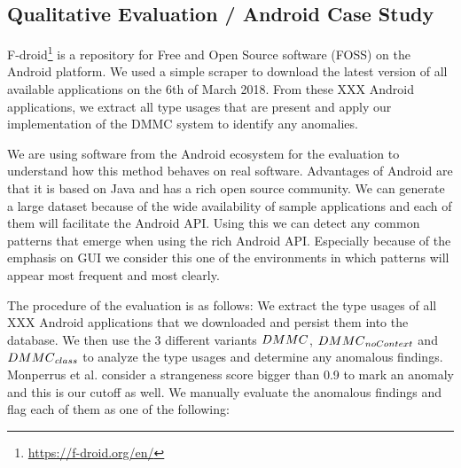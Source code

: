 \subsection{Qualitative Evaluation / Android Case Study}

F-droid\footnote{\url{https://f-droid.org/en/}} is a repository for Free and Open Source software (FOSS) on the Android platform.
We used a simple scraper to download the latest version of all available applications on the 6th of March 2018.
From these XXX Android applications, we extract all type usages that are present and apply our implementation of the DMMC system to identify any anomalies.

We are using software from the Android ecosystem for the evaluation to understand how this method behaves on real software.
Advantages of Android are that it is based on Java and has a rich open source community.
We can generate a large dataset because of the wide availability of sample applications and each of them will facilitate the Android API.
Using this we can detect any common patterns that emerge when using the rich Android API.
Especially because of the emphasis on GUI we consider this one of the environments in which patterns will appear most frequent and most clearly.

The procedure of the evaluation is as follows:
We extract the type usages of all XXX Android applications that we downloaded and persist them into the database.
We then use the 3 different variants $\mathnormal{DMMC}$, $\mathnormal{DMMC}_{\mathnormal{noContext}}$ and $\mathnormal{DMMC}_{\mathnormal{class}}$ to analyze the type usages and determine any anomalous findings.
Monperrus et al. consider a strangeness score bigger than 0.9 to mark an anomaly and this is our cutoff as well.
We manually evaluate the anomalous findings and flag each of them as one of the following:

